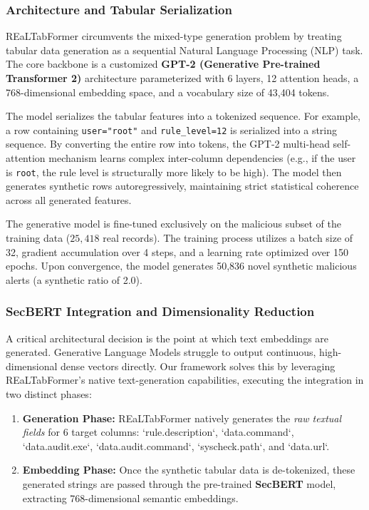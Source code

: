 \subsubsection{Architecture and Tabular Serialization}

REaLTabFormer circumvents the mixed-type generation problem by treating tabular data generation as a sequential Natural Language Processing (NLP) task. The core backbone is a customized \textbf{GPT-2 (Generative Pre-trained Transformer 2)} architecture parameterized with 6 layers, 12 attention heads, a 768-dimensional embedding space, and a vocabulary size of 43,404 tokens.

The model serializes the tabular features into a tokenized sequence. For example, a row containing \texttt{user="root"} and \texttt{rule\_level=12} is serialized into a string sequence. By converting the entire row into tokens, the GPT-2 multi-head self-attention mechanism learns complex inter-column dependencies (e.g., if the user is \texttt{root}, the rule level is structurally more likely to be high). The model then generates synthetic rows autoregressively, maintaining strict statistical coherence across all generated features.

The generative model is fine-tuned exclusively on the malicious subset of the training data ($25,418$ real records). The training process utilizes a batch size of 32, gradient accumulation over 4 steps, and a learning rate optimized over 150 epochs. Upon convergence, the model generates 50,836 novel synthetic malicious alerts (a synthetic ratio of 2.0).

\subsubsection{SecBERT Integration and Dimensionality Reduction}

A critical architectural decision is the point at which text embeddings are generated. Generative Language Models struggle to output continuous, high-dimensional dense vectors directly. Our framework solves this by leveraging REaLTabFormer's native text-generation capabilities, executing the integration in two distinct phases:

\begin{enumerate}
    \item \textbf{Generation Phase:} REaLTabFormer natively generates the \textit{raw textual fields} for 6 target columns: `rule.description`, `data.command`, `data.audit.exe`, `data.audit.command`, `syscheck.path`, and `data.url`.
    \item \textbf{Embedding Phase:} Once the synthetic tabular data is de-tokenized, these generated strings are passed through the pre-trained \textbf{SecBERT} model, extracting 768-dimensional semantic embeddings.
\end{enumerate}

